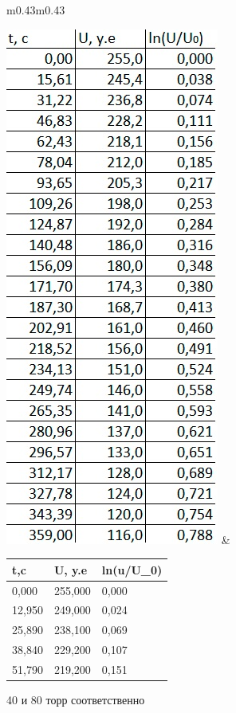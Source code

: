 \documentclass[a4paper,12pt]{article}
\theoremstyle{plain} %
\theoremstyle{definition} %
\theoremstyle{remark} %
\begin{document}
\begin{figure}[H]

\caption{40 и 80 торр соответственно}

\begin{tabular}{m{0.43\linewidth}m{0.43\linewidth}}

{\includegraphics[width=0.59\linewidth]{izm1.jpg}}
&
\begin{tabular}[r]{|l|l|l|}
\hline
t,c     & U, y.e  & ln(u/U\_0) \\ \hline
0,000   & 255,000 & 0,000      \\ \hline
12,950  & 249,000 & 0,024      \\ \hline
25,890  & 238,100 & 0,069      \\ \hline
38,840  & 229,200 & 0,107      \\ \hline
51,790  & 219,200 & 0,151      \\ \hline

\end{tabular}
\end{tabular}
\end{figure}
\end{document}

